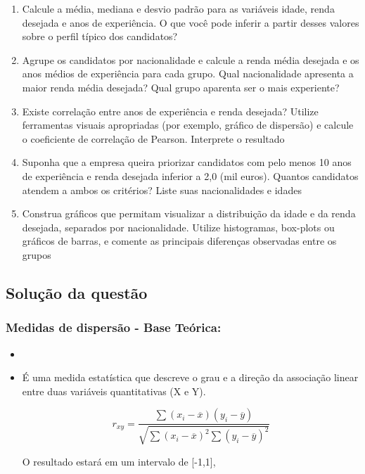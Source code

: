 \documentclass[a4paper,11pt]{article}
\begin{document}
\begin{enumerate}[leftmargin=*]
\item Calcule a média, mediana e desvio padrão para as variáveis idade, renda desejada e
anos de experiência. O que você pode inferir a partir desses valores sobre o perfil típico dos candidatos?

\item  Agrupe os candidatos por nacionalidade e calcule a renda média desejada e os anos
médios de experiência para cada grupo. Qual nacionalidade apresenta a maior renda
média desejada? Qual grupo aparenta ser o mais experiente?

\item Existe correlação entre anos de experiência e renda desejada? Utilize ferramentas visuais apropriadas (por exemplo, gráfico de dispersão) e calcule o coeficiente de correlação
de Pearson. Interprete o resultado

\item Suponha que a empresa queira priorizar candidatos com pelo menos 10 anos de experiência e renda desejada inferior a 2,0 (mil euros). Quantos candidatos atendem a ambos
os critérios? Liste suas nacionalidades e idades

\item Construa gráficos que permitam visualizar a distribuição da idade e da renda desejada,
separados por nacionalidade. Utilize histogramas, box-plots ou gráficos de barras, e
comente as principais diferenças observadas entre os grupos

\end{enumerate}

\subsection*{Solução da questão} 					

\subsubsection*{Medidas de dispersão - Base Teórica:} 

\begin{itemize}
\item[]

    \item É uma medida estatística que descreve o grau e a direção da associação linear entre duas variáveis quantitativas (X e Y).

    \[r_{xy} = \frac{\sum{(x_i - \overline{x})(y_i-\overline{y})}}{\sqrt{\sum (x_i - \overline{x})^2 \sum(y_i-\overline{y})^2}}\]

    O resultado estará em um intervalo de [-1,1], 

\end{itemize}
\end{document}
